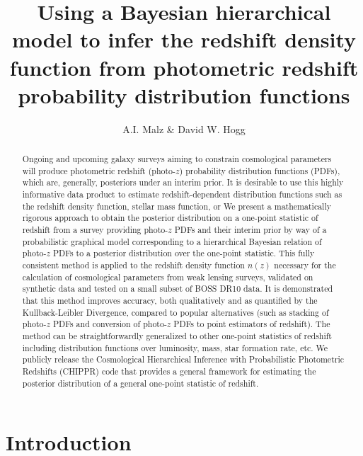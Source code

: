 \documentclass[preprint]{aastex}
\begin{document}
\title{Using a Bayesian hierarchical model to infer the redshift density function from photometric redshift probability distribution functions}

\author{A.I. Malz \& David W. Hogg %
}


\begin{abstract}
Ongoing and upcoming galaxy surveys aiming to constrain cosmological parameters will produce photometric redshift (photo-$z$) probability distribution functions (PDFs), which are, generally, posteriors under an interim prior.  It is desirable to use this highly informative data product to estimate redshift-dependent distribution functions such as the redshift density function, stellar mass function, or We present a mathematically rigorous approach to obtain the posterior distribution on a one-point statistic of redshift from a survey providing photo-$z$ PDFs and their interim prior by way of a probabilistic graphical model corresponding to a hierarchical Bayesian relation of photo-$z$ PDFs to a posterior distribution over the one-point statistic.  This fully consistent method is applied to the redshift density function $n(z)$ necessary for the calculation of cosmological parameters from weak lensing surveys, validated on synthetic data and tested on a small subset of BOSS DR10 data.  It is demonstrated that this method improves accuracy, both qualitatively and as quantified by the Kullback-Leibler Divergence, compared to popular alternatives (such as stacking of photo-$z$ PDFs and conversion of photo-$z$ PDFs to point estimators of redshift).  The method can be straightforwardly generalized to other one-point statistics of redshift including distribution functions over luminosity, mass, star formation rate, etc.  We publicly release the Cosmological Hierarchical Inference with Probabilistic Photometric Redshifts (CHIPPR) code that provides a general framework for estimating the posterior distribution of a general one-point statistic of redshift.
\end{abstract}


\section{Introduction}
\label{sec:intro}
\end{document}

